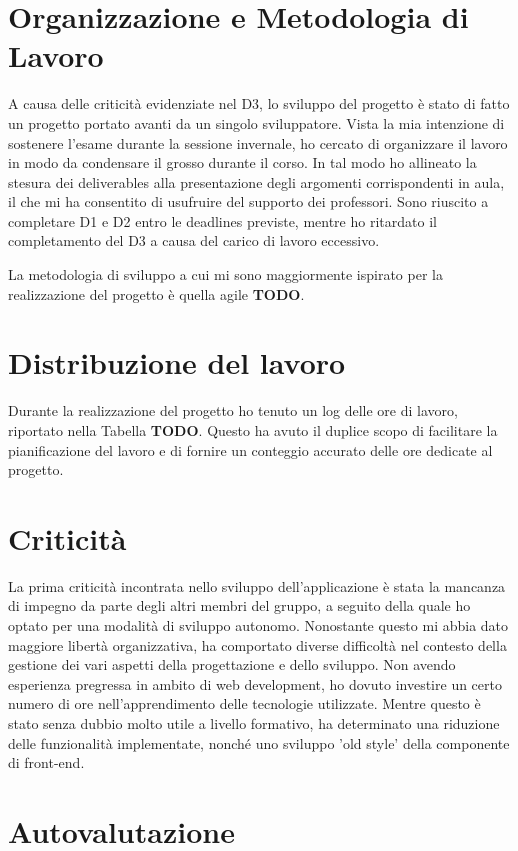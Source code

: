 \documentclass[9pt]{extarticle}
\begin{document}
\customtitle

\tableofcontents
\newpage

\section{Organizzazione e Metodologia di Lavoro}

A causa delle criticità evidenziate nel D3, lo sviluppo del progetto è stato
di fatto un progetto portato avanti da un singolo sviluppatore. Vista la mia
intenzione di sostenere l'esame durante la sessione invernale, ho cercato di
organizzare il lavoro in modo da condensare il grosso durante il corso. In tal
modo ho allineato la stesura dei deliverables alla presentazione degli
argomenti corrispondenti in aula, il che mi ha consentito di usufruire del
supporto dei professori. Sono riuscito a completare D1 e D2 entro le deadlines
previste, mentre ho ritardato il completamento del D3 a causa del carico di
lavoro eccessivo.\newline

La metodologia di sviluppo a cui mi sono maggiormente ispirato per la
realizzazione del progetto è quella agile \textbf{TODO}.

\section{Distribuzione del lavoro}

Durante la realizzazione del progetto ho tenuto un log delle ore di lavoro,
riportato nella Tabella \textbf{TODO}. Questo ha avuto il duplice scopo di
facilitare la pianificazione del lavoro e di fornire un conteggio accurato
delle ore dedicate al progetto.

\section{Criticità}

La prima criticità incontrata nello sviluppo dell'applicazione è stata
la mancanza di impegno da parte degli altri membri del gruppo, a
seguito della quale ho optato per una modalità di sviluppo autonomo.
Nonostante questo mi abbia dato maggiore libertà organizzativa, ha comportato
diverse difficoltà nel contesto della gestione dei vari aspetti della
progettazione e dello sviluppo. Non avendo esperienza pregressa in ambito di
web development, ho dovuto investire un certo numero di ore nell'apprendimento
delle tecnologie utilizzate. Mentre questo è stato senza dubbio molto utile
a livello formativo, ha determinato una riduzione delle funzionalità
implementate, nonché uno sviluppo 'old style' della componente di front-end.



\section{Autovalutazione}
\end{document}
